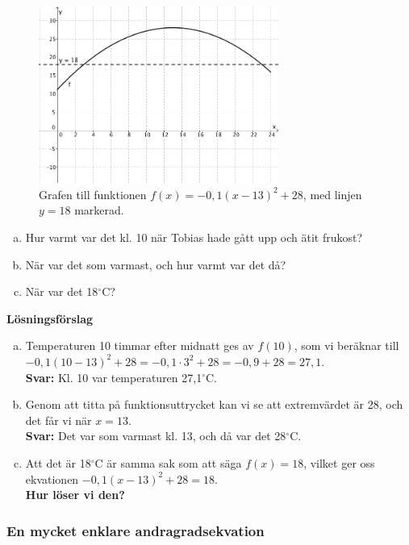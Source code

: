 \begin{figure}
  \centering
  \includegraphics[width=0.7\textwidth]{bilder/temperatur.png}
  \caption{\label{fig:temperatur}Grafen till funktionen $f(x) = -0,1(x-13)^2+28$, med linjen $y=18$ markerad.}
\end{figure}

\begin{enumerate}[(a)]
  \item Hur varmt var det kl. 10 när Tobias hade gått upp och ätit frukost?
  \item När var det som varmast, och hur varmt var det då?
  \item När var det 18$^{\circ}$C?
\end{enumerate}

\textbf{Lösningsförslag}
\begin{enumerate}[(a)]
  \item Temperaturen 10 timmar efter midnatt ges av $f(10)$, som vi beräknar till $-0,1(10-13)^2+28 = -0,1 \cdot 3^2 + 28 = -0,9+28 = 27,1$. \\
  \textbf{Svar:} Kl. 10 var temperaturen 27,1$^{\circ}$C.
  \item Genom att titta på funktionsuttrycket kan vi se att extremvärdet är 28, och det får vi när $x=13$. \\
  \textbf{Svar:} Det var som varmast kl. 13, och då var det 28$^{\circ}$C.
  \item Att det är 18$^{\circ}$C är samma sak som att säga $f(x)=18$, vilket ger oss ekvationen $-0,1(x-13)^2+28=18$. \\
  \textbf{Hur löser vi den?}
\end{enumerate}

\subsubsection{En mycket enklare andragradsekvation}

